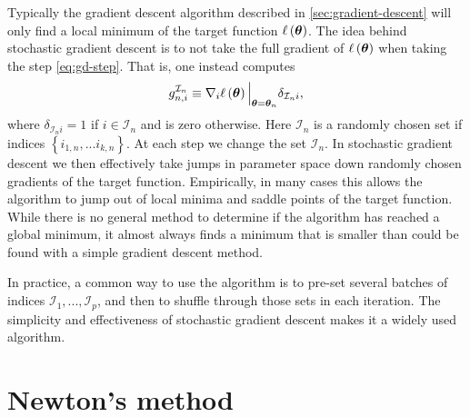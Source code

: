 Typically the gradient descent algorithm described in \eqref{sec:gradient-descent} will only find a local minimum of the target function $\ell\left({\bm \theta}\right)$.
The idea behind stochastic gradient descent is to not take the full gradient of $\ell\left({\bm \theta}\right)$ when taking the step \eqref{eq:gd-step}.
That is, one instead computes 
\begin{align}
    g^{\mathcal{I}_n}_{n,i}
    \equiv
    \nabla_i\ell\left({\bm \theta}\right)\Big|_{{\bm \theta}={\bm \theta}_n}\delta_{\mathcal{I}_ni}
    ,
\end{align}
where $\delta_{\mathcal{I}_ni}=1$ if $i\in\mathcal{I}_n$ and is zero otherwise.
Here $\mathcal{I}_n$ is a randomly chosen set if indices $\left\{i_{1,n},...i_{k,n}\right\}$.
At each step we change the set $\mathcal{I}_n$. 
In stochastic gradient descent we then effectively take jumps in parameter space down randomly chosen gradients of the target function.
Empirically, in many cases this allows the algorithm to jump out of local minima and saddle points of the target function.
While there is no general method to determine if the algorithm has reached a global minimum, it almost always finds a minimum that is smaller than could be found with a simple gradient descent method.

In practice, a common way to use the algorithm is to pre-set several batches of indices $\mathcal{I}_1,...,\mathcal{I}_p$, and then to shuffle through those sets in each iteration.
The simplicity and effectiveness of stochastic gradient descent makes it a widely used algorithm. 

\section{Newton's method\label{sec:newtons-method}}


